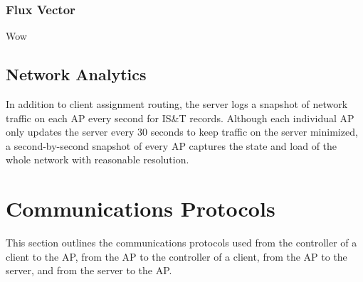 \documentclass[10pt,journal,compsoc]{IEEEtran}
\begin{document}
		\subsubsection{Flux Vector}
		Wow
		
		\subsection{Network Analytics}
		In addition to client assignment routing, the server logs a snapshot of network traffic on each AP every second for IS\&T records. Although each individual AP only updates the server every 30 seconds to keep traffic on the server minimized, a second-by-second snapshot of every AP captures the state and load of the whole network with reasonable resolution.
		
		\section{Communications Protocols}
		This section outlines the communications protocols used from the controller of a client to the AP, from the AP to the controller of a client, from the AP to the server, and from the server to the AP.
		
\end{document}
